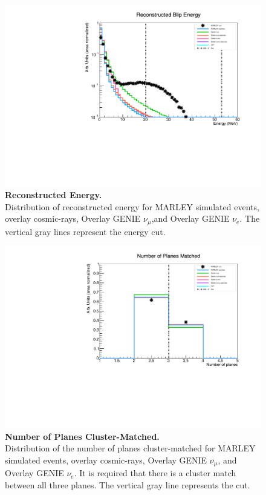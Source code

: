 \begin{figure}[h!]
    \centering
    \includegraphics[width=120mm]{Figures/Energy_MC.pdf}
    \caption[Reconstructed Energy.]{{\textbf{Reconstructed Energy.}}\\ Distribution of reconstructed energy for MARLEY simulated events, overlay cosmic-rays, Overlay GENIE $\nu_{\mu}$,and Overlay GENIE $\nu_{e}$. The vertical gray lines represent the energy cut.}
 \label{blip_energy}
\end{figure}

\begin{figure}[h!]
    \centering
    \includegraphics[width=120mm]{Figures/blip_n_planes.pdf}
    \caption[Number of Planes Cluster-Matched.]{{\textbf{Number of Planes Cluster-Matched.}}\\ Distribution of the number of planes cluster-matched for MARLEY simulated events, overlay cosmic-rays, Overlay GENIE $\nu_{\mu}$, and Overlay GENIE $\nu_{e}$. It is required that there is a cluster match between all three planes. The vertical gray line represents the cut.}
 \label{blip_nplanes}
\end{figure}

